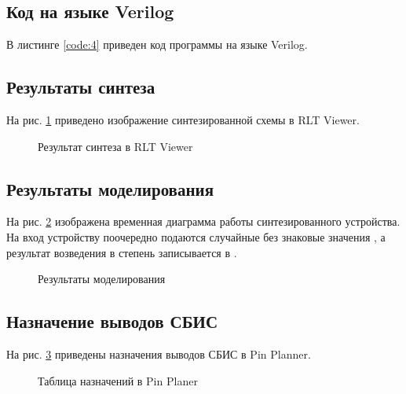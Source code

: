 \subsection{Код на языке Verilog}

В листинге \ref{code:4} приведен код программы на языке Verilog.

%

\subsection{Результаты синтеза}

На рис. \ref{fig:lab3_4_rtl} приведено изображение синтезированной схемы в RLT Viewer.

\begin{figure}[H]
\begin{center}
	\caption{Результат синтеза в RLT Viewer}
	\label{fig:lab3_4_rtl}
\end{center}
\end{figure}

\subsection{Результаты моделирования}
\label{sec:lab3_4_modeling}

На рис. \ref{fig:lab3_4_modeling} изображена временная диаграмма работы синтезированного устройства. На вход устройству поочередно подаются случайные без знаковые значения , а результат возведения в степень записывается в .
\begin{figure}[H]
\begin{center}
	\caption{Результаты моделирования}
	\label{fig:lab3_4_modeling}
\end{center}
\end{figure}

\subsection{Назначение выводов СБИС}

На рис. \ref{fig:lab3_4_pins} приведены назначения выводов СБИС в Pin Planner.

\begin{figure}[H]
\begin{center}
	\caption{Таблица назначений в Pin Planer}
	\label{fig:lab3_4_pins}
\end{center}
\end{figure}

